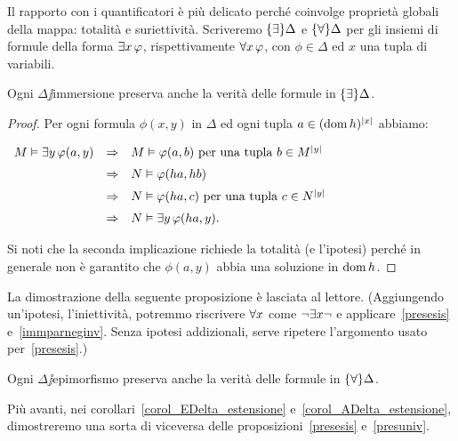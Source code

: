 Il rapporto con i quantificatori \`e pi\`u delicato perch\'e coinvolge propriet\`a globali della mappa: totalit\`a e suriettivit\`a. Scriveremo $\{\exists\}\Delta$ e $\{\forall\}\Delta$ per gli insiemi di formule della forma $\exists x\,\varphi$, rispettivamente $\forall x\,\varphi$, con $\phi\in\Delta$ ed $x$ una tupla di variabili.


\begin{proposition}\label{presesis}
Ogni $\Delta\jj$immersione preserva anche la verit\`a delle formule in $\{\exists\}\Delta$.
\end{proposition}
\begin{proof}
Per ogni formula $\phi(x,y)$ in $\Delta$ ed ogni tupla  $a\in(\mathop{\rm dom} h)^{|x|}$ abbiamo:

\hfil
$\begin{array}{rcl}
M\models\E y\,\phi(a,y) %
&\IMP& M\models\phi(a,b)\textrm{ per una tupla } b\in M^{|y|}  \\[2mm]
&\IMP& N\models\phi(ha,hb) \\[2mm]
&\IMP& N\models\phi(ha,c)\textrm{ per una tupla } c\in N^{|y|}  \\[2mm]
&\IMP& N\models\E y\,\phi(ha,y).\\
\end{array}$

Si noti che la seconda implicazione richiede la totalit\`a (e l'ipotesi) perch\'e in generale non \`e garantito che $\phi(a,y)$ abbia una soluzione in $\mathop{\rm dom} h$.
\end{proof}

La dimostrazione della seguente proposizione \`e lasciata al lettore. (Aggiungendo un'ipotesi, l'iniettivit\`a, potremmo riscrivere $\forall x$ come $\neg\exists x\neg$ e applicare~\ref{presesis} e~\ref{immparneginv}. Senza ipotesi addizionali, serve ripetere l'argomento usato per~\ref{presesis}.)

\begin{proposition}\label{presuniv}
Ogni $\Delta\jj$epimorfismo preserva anche la verit\`a delle formule in $\{\forall\}\Delta$.\QED
\end{proposition}

Pi\`u avanti, nei corollari~\ref{corol_EDelta_estensione} e~\ref{corol_ADelta_estensione}, dimostreremo una sorta di viceversa  delle proposizioni~\ref{presesis} e~\ref{presuniv}.



